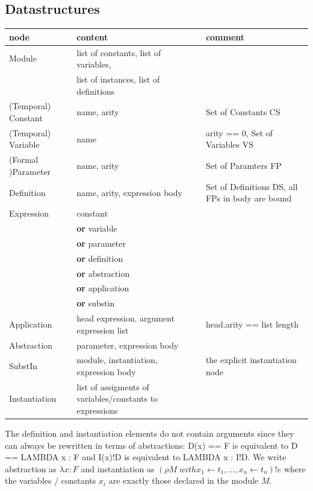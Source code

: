 \documentclass[a4paper]{article}
\newcommand{\dor}{\textbf{or}}
\begin{document}
\subsection{Datastructures}
\label{sec:ds}

\begin{tabular}{lp{}p{}}
node & content & comment \\
\hline
Module & list of constants, list of variables, & \\
       & list of instances, list of definitions & \\
(Temporal) Constant  & name, arity & Set of Constants CS \\
(Temporal) Variable  & name & arity == 0, Set of Variables VS \\
(Formal )Parameter & name, arity & Set of Paramters FP \\
Definition & name, arity, expression body & Set of Definitions DS,
                                            all FPs in body are bound \\
Expression  & constant & \\
          & \dor{} variable & \\
          & \dor{} parameter & \\
          & \dor{} definition & \\
          & \dor{} abstraction &\\
          & \dor{} application &\\
          & \dor{} substin & \\
Application & head expression, argument expression list & head.arity == list length\\
Abstraction & parameter, expression body & \\
SubstIn     & module, instantiation, expression body & the explicit instantiation node \\
Instantiation & list of assigments of variables/constants to expressions& \\
\end{tabular}

The definition and instantiation elements do not contain arguments since they
 can always be rewritten in terms of abstractions: D(x) == F is equivalent to
 D == LAMBDA x : F and I(x)!D is equivalent to LAMBDA x : I!D. We write
 abstraction as $\lambda x : F$ and instantiation as $(\rho M\; with x_1
 \leftarrow t_1,\ldots,x_n \leftarrow t_n)!e$ where the variables / constants
 $x_i$ are exactly those declared in the module $M$.
\end{document}
